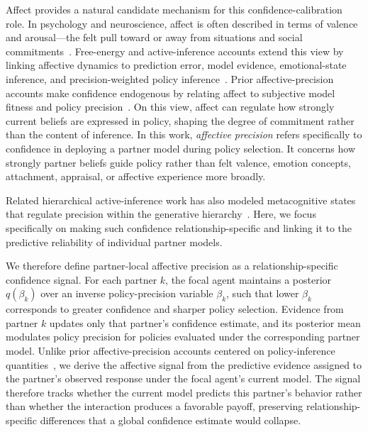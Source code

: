 \documentclass[runningheads,orivec]{llncs}
\begin{document}
Affect provides a natural candidate mechanism for this confidence-calibration role. In psychology and neuroscience, affect is often described in terms of valence and arousal---the felt pull toward or away from situations and social commitments~\cite{Barrett2006EmotionParadox}. Free-energy and active-inference accounts extend this view by linking affective dynamics to prediction error, model evidence, emotional-state inference, and precision-weighted policy inference~\cite{Hesp2021DeeplyFeltAffect,joffily2013emotional,pattisapu2024free,smith2019simulating}. Prior affective-precision accounts make confidence endogenous by relating affect to subjective model fitness and policy precision~\cite{Hesp2021DeeplyFeltAffect}. On this view, affect can regulate how strongly current beliefs are expressed in policy, shaping the degree of commitment rather than the content of inference. In this work, \emph{affective precision} refers specifically to confidence in deploying a partner model during policy selection. It concerns how strongly partner beliefs guide policy rather than felt valence, emotion concepts, attachment, appraisal, or affective experience more broadly.

Related hierarchical active-inference work has also modeled metacognitive states that regulate precision within the generative hierarchy~\cite{SandvedSmith2021MentalAction}. Here, we focus specifically on making such confidence relationship-specific and linking it to the predictive reliability of individual partner models.

We therefore define partner-local affective precision as a relationship-specific confidence signal. For each partner \(k\), the focal agent maintains a posterior \(q(\beta_k)\) over an inverse policy-precision variable \(\beta_k\), such that lower \(\beta_k\) corresponds to greater confidence and sharper policy selection. Evidence from partner \(k\) updates only that partner's confidence estimate, and its posterior mean modulates policy precision for policies evaluated under the corresponding partner model. Unlike prior affective-precision accounts centered on policy-inference quantities~\cite{Hesp2021DeeplyFeltAffect}, we derive the affective signal from the predictive evidence assigned to the partner's observed response under the focal agent's current model. The signal therefore tracks whether the current model predicts this partner's behavior rather than whether the interaction produces a favorable payoff, preserving relationship-specific differences that a global confidence estimate would collapse.
\end{document}

